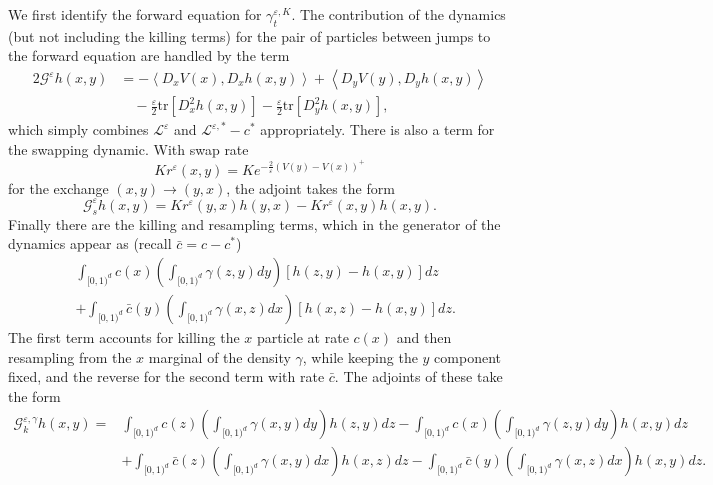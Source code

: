 \documentclass[english,11pt]{article}%
\numberwithin{equation}{section}
\numberwithin{example}{section}
\numberwithin{theorem}{section}
\begin{document}
We first identify the forward equation for $\gamma_{t}^{\varepsilon,K}$. The
contribution of the dynamics (but not including the killing terms) for the
pair of particles between jumps to the forward equation are handled by the
term%
\begin{align*}
2\mathcal{G}^{\varepsilon}h(x,y)  &  =-\left\langle D_{x}V(x),D_{x}%
h(x,y)\right\rangle +\left\langle D_{y}V(y),D_{y}h(x,y)\right\rangle \\
&  \quad-\frac{\varepsilon}{2}\text{tr}[D_{x}^{2}h(x,y)]-\frac{\varepsilon}%
{2}\text{tr}[D_{y}^{2}h(x,y)],
\end{align*}
which simply combines $\mathcal{L}^{\varepsilon}$ and $\mathcal{L}%
^{\varepsilon,\ast}-c^{\ast}$ appropriately. There is also a term for the
swapping dynamic. With swap rate
\[
Kr^{\varepsilon}(x,y)=Ke^{-\frac{2}{\varepsilon}(V(y)-V(x))^{+}}%
\]
for the exchange $(x,y)\rightarrow(y,x)$, the adjoint takes the form
\begin{equation}
\mathcal{G}_{s}^{\varepsilon}h(x,y)=Kr^{\varepsilon}%
(y,x)h(y,x)-Kr^{\varepsilon}(x,y)h(x,y). \label{eqn:defofGs}%
\end{equation}
Finally there are the killing and resampling terms, which in the generator of
the dynamics appear as (recall $\bar{c}=c-c^{\ast}$)
\begin{align*}
&  \int_{[0,1)^{d}}c(x)\left(  \int_{[0,1)^{d}}\gamma(z,y)dy\right)  \left[
h(z,y)-h(x,y)\right]  dz\\
&  +\int_{[0,1)^{d}}\bar{c}(y)\left(  \int_{[0,1)^{d}}\gamma(x,z)dx\right)
\left[  h(x,z)-h(x,y)\right]  dz.
\end{align*} 
The first term accounts for killing the $x$ particle at rate $c(x)$ and then
resampling from the $x$ marginal of the density $\gamma$, while keeping the
$y$ component fixed, and the reverse for the second term with rate $\bar{c}$.
The adjoints of these take the form
\begin{align*}
\mathcal{G}_{k}^{\varepsilon,\gamma}h(x,y)=  &  \int_{[0,1)^{d}}c(z)\left(
\int_{[0,1)^{d}}\gamma(x,y)dy\right)  h(z,y)dz-\int_{[0,1)^{d}}c(x)\left(
\int_{[0,1)^{d}}\gamma(z,y)dy\right)  h(x,y)dz\\
&  +\int_{[0,1)^{d}}\bar{c}(z)\left(  \int_{[0,1)^{d}}\gamma(x,y)dx\right)
h(x,z)dz-\int_{[0,1)^{d}}\bar{c}(y)\left(  \int_{[0,1)^{d}}\gamma
(x,z)dx\right)  h(x,y)dz.
\end{align*}
\end{document}
